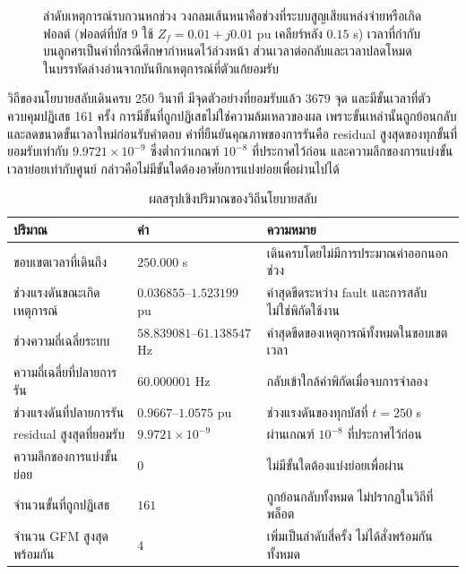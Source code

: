 \documentclass[12pt,a4paper]{article}
\newcommand{\tablefont}{\fontsize{15}{17.2}\selectfont}
\newcommand{\second}{\ensuremath{\,\mathrm{s}}}
\newcommand{\tableheader}{\bfseries}
\begin{document}
\begin{figure}[H]
\caption{ลำดับเหตุการณ์รบกวนหกช่วง วงกลมเส้นหนาคือช่วงที่ระบบสูญเสียแหล่งจ่ายหรือเกิดฟอลต์ (ฟอลต์ที่บัส 9 ใช้ $Z_f=0.01+j0.01$ pu เคลียร์หลัง $0.15$ s) เวลาที่กำกับบนลูกศรเป็นค่าที่กรณีศึกษากำหนดไว้ล่วงหน้า ส่วนเวลาต่อกลับและเวลาปลดโหมดในบรรทัดล่างอ่านจากบันทึกเหตุการณ์ที่ตัวแก้ยอมรับ}
\label{fig:periods}
\end{figure}

วิถีของนโยบายสลับเดินครบ 250 วินาที มีจุดตัวอย่างที่ยอมรับแล้ว 3679 จุด และมีขั้นเวลาที่ตัวควบคุมปฏิเสธ 161 ครั้ง การมีขั้นที่ถูกปฏิเสธไม่ใช่ความล้มเหลวของผล เพราะขั้นเหล่านั้นถูกย้อนกลับและลดขนาดขั้นเวลาใหม่ก่อนรับคำตอบ ค่าที่ยืนยันคุณภาพของการรันคือ residual สูงสุดของทุกขั้นที่ยอมรับเท่ากับ $9.9721\times10^{-9}$ ซึ่งต่ำกว่าเกณฑ์ $10^{-8}$ ที่ประกาศไว้ก่อน และความลึกของการแบ่งขั้นเวลาย่อยเท่ากับศูนย์ กล่าวคือไม่มีขั้นใดต้องอาศัยการแบ่งย่อยเพื่อผ่านไปได้
\begin{table}[H]
\begin{center}
\tablefont
\caption{ผลสรุปเชิงปริมาณของวิถีนโยบายสลับ}
\label{tab:runsummary}
\begin{tabularx}{0.99\textwidth}{@{}l l L@{}}
\toprule
\tableheader ปริมาณ & ค่า & ความหมาย \\
\midrule
ขอบเขตเวลาที่เดินถึง & $250.000$ s & เดินครบโดยไม่มีการประมาณค่าออกนอกช่วง \\
ช่วงแรงดันขณะเกิดเหตุการณ์ & $0.036855$--$1.523199$ pu & ค่าสุดขีดระหว่าง fault และการสลับ ไม่ใช่พิกัดใช้งาน \\
ช่วงความถี่เฉลี่ยระบบ & $58.839081$--$61.138547$ Hz & ค่าสุดขีดของเหตุการณ์ทั้งหมดในขอบเขตเวลา \\
ความถี่เฉลี่ยที่ปลายการรัน & $60.000001$ Hz & กลับเข้าใกล้ค่าพิกัดเมื่อจบการจำลอง \\
ช่วงแรงดันที่ปลายการรัน & $0.9667$--$1.0575$ pu & ช่วงแรงดันของทุกบัสที่ $t=250$ s \\
residual สูงสุดที่ยอมรับ & $9.9721\times10^{-9}$ & ผ่านเกณฑ์ $10^{-8}$ ที่ประกาศไว้ก่อน \\
ความลึกของการแบ่งขั้นย่อย & $0$ & ไม่มีขั้นใดต้องแบ่งย่อยเพื่อผ่าน \\
จำนวนขั้นที่ถูกปฏิเสธ & $161$ & ถูกย้อนกลับทั้งหมด ไม่ปรากฏในวิถีที่พล็อต \\
จำนวน GFM สูงสุดพร้อมกัน & $4$ & เพิ่มเป็นลำดับสี่ครั้ง ไม่ได้สั่งพร้อมกันทั้งหมด \\
\bottomrule
\end{tabularx}
\end{center}
\end{table}
\end{document}
